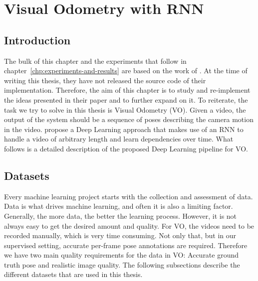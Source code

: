 \chapter{Visual Odometry with RNN}
\label{chp:the_model}

	\def\CC{{C\nolinebreak[4]\hspace{-.05em}\raisebox{.4ex}{\tiny\bf ++}}}

	\section{Introduction}
		The bulk of this chapter and the experiments that follow in chapter~\ref{chp:experiments-and-results} are based on the work of \cite{wang2017deepvo}.
		At the time of writing this thesis, they have not released the source code of their implementation.
		Therefore, the aim of this chapter is to study and re-implement the ideas presented in their paper and to further expand on it.
		To reiterate, the task we try to solve in this thesis is Visual Odometry (VO).
		Given a video, the output of the system should be a sequence of poses describing the camera motion in the video.
		\citeauthor{wang2017deepvo} propose a Deep Learning approach that makes use of an RNN to handle a video of arbitrary length and learn dependencies over time.
		What follows is a detailed description of the proposed Deep Learning pipeline for VO.
		
	\section{Datasets}
		Every machine learning project starts with the collection and assessment of data.
		Data is what drives machine learning, and often it is also a limiting factor.
		Generally, the more data, the better the learning process.
		However, it is not always easy to get the desired amount and quality.
		For VO, the videos need to be recorded manually, which is very time consuming.
		Not only that, but in our supervised setting, accurate per-frame pose annotations are required.
		Therefore we have two main quality requirements for the data in VO: Accurate ground truth pose and realistic image quality.
		The following subsections describe the different datasets that are used in this thesis.
		
